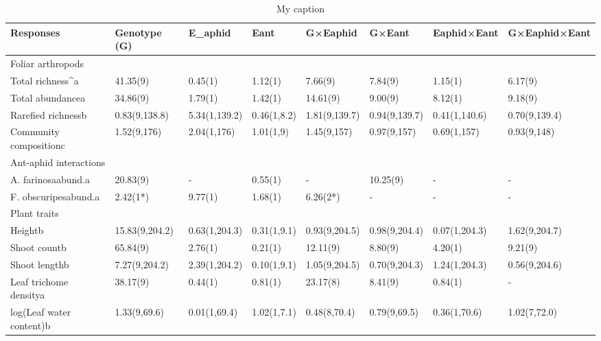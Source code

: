\begin{table}[]
\centering
\caption{My caption}
\label{my-label}
\begin{tabular}{@{}llllllll@{}}
\toprule
Responses                & Genotype (G)   & E_{aphid}        & Eant        & G×Eaphid      & G×Eant        & Eaphid×Eant   & G×Eaphid×Eant \\ \midrule
Foliar arthropods        &                &               &             &               &               &               &               \\
Total richness^a         & 41.35(9)       & 0.45(1)       & 1.12(1)     & 7.66(9)       & 7.84(9)       & 1.15(1)       & 6.17(9)       \\
Total abundancea         & 34.86(9)       & 1.79(1)       & 1.42(1)     & 14.61(9)      & 9.00(9)       & 8.12(1)       & 9.18(9)       \\
Rarefied richnessb       & 0.83(9,138.8)  & 5.34(1,139.2) & 0.46(1,8.2) & 1.81(9,139.7) & 0.94(9,139.7) & 0.41(1,140.6) & 0.70(9,139.4) \\
Community compositionc   & 1.52(9,176)    & 2.04(1,176)   & 1.01(1,9)   & 1.45(9,157)   & 0.97(9,157)   & 0.69(1,157)   & 0.93(9,148)   \\
Ant-aphid interactions   &                &               &             &               &               &               &               \\
A. farinosaabund.a       & 20.83(9)       & -             & 0.55(1)     & -             & 10.25(9)      & -             & -             \\
F. obscuripesabund.a     & 2.42(1*)       & 9.77(1)       & 1.68(1)     & 6.26(2*)      & -             & -             & -             \\
Plant traits             &                &               &             &               &               &               &               \\
Heightb                  & 15.83(9,204.2) & 0.63(1,204.3) & 0.31(1,9.1) & 0.93(9,204.5) & 0.98(9,204.4) & 0.07(1,204.3) & 1.62(9,204.7) \\
Shoot countb             & 65.84(9)       & 2.76(1)       & 0.21(1)     & 12.11(9)      & 8.80(9)       & 4.20(1)       & 9.21(9)       \\
Shoot lengthb            & 7.27(9,204.2)  & 2.39(1,204.2) & 0.10(1,9.1) & 1.05(9,204.5) & 0.70(9,204.3) & 1.24(1,204.3) & 0.56(9,204.6) \\
Leaf trichome densitya   & 38.17(9)       & 0.44(1)       & 0.81(1)     & 23.17(8)      & 8.41(9)       & 0.84(1)       & -             \\
log(Leaf water content)b & 1.33(9,69.6)   & 0.01(1,69.4)  & 1.02(1,7.1) & 0.48(8,70.4)  & 0.79(9,69.5)  & 0.36(1,70.6)  & 1.02(7,72.0)  \\ \bottomrule
\end{tabular}
\end{table}